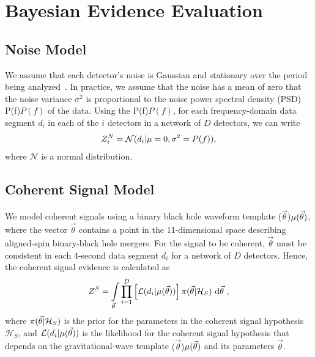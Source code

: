 \documentclass[
 nofootinbib,
 amsmath,amssymb,
 aps,
 twocolumn,
 superscriptaddress
]{revtex4-2}
\newcommand{\mathcmd}[1]{{\sc \relax\ifmmode#1\else $#1$\fi}\xspace}
\newcommand{\psd}{\mathcmd{P(f)}}
\newcommand{\parameters}{\mathcmd{\vec{\theta}}}
\newcommand{\template}{\mathcmd{\mu(\parameters)}}
\begin{document}
\appendix



\section{Bayesian Evidence Evaluation}\label{sec:bayesianEvidEval}

\subsection{Noise Model}
We assume that each detector's noise is Gaussian and stationary over the period being analyzed~\cite{ligo_psd}. In practice, we assume that the noise has a mean of zero that the noise variance $\sigma^2$ is proportional to the noise power spectral density (PSD) \psd of the data. Using the \psd, for each frequency-domain data segment $d_i$ in each of the $i$ detectors in a network of $D$ detectors, we can write 
\begin{equation}
\label{eq:zn}
Z^N_i = \mathcal{N}(d_i|\mu=0,\sigma^2=\psd),
\end{equation}
where $\mathcal{N}$ is a normal distribution. 

\subsection{Coherent Signal Model}
We model coherent signals using a binary black hole waveform template \template, where the vector \parameters contains a point in the 11-dimensional space describing aligned-spin binary-black hole mergers. For the signal to be coherent, \parameters must be consistent in each 4-second data segment $d_i$ for a network of $D$ detectors. Hence, the coherent signal evidence is calculated as
\begin{equation}
\label{eq:zs}
Z^S = \int\limits_{\parameters} \prod\limits^{D}_{i=1} \left[ \mathcal{L}(d_i|\template)\right] \pi(\parameters | \mathcal{H}_S)\  \text{d}\parameters \ ,
\end{equation}
where $\pi(\parameters| \mathcal{H}_S)$ is the prior for the parameters in the coherent signal hypothesis $\mathcal{H}_S$, and $\mathcal{L}(d_i|\template)$ is the likelihood for the coherent signal hypothesis that depends on the gravitational-wave template \template and its parameters \parameters. 
\end{document}
